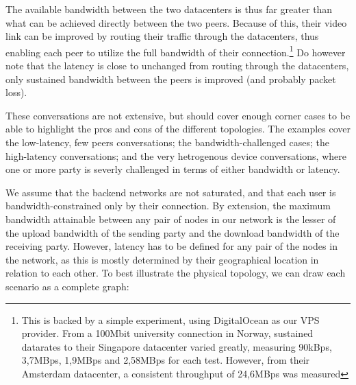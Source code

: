 The available bandwidth between the two datacenters is thus far greater than what can be achieved directly between the two peers. Because of this, their video link can be improved by routing their traffic through the datacenters, thus enabling each peer to utilize the full bandwidth of their connection.\footnote{This is backed by a simple experiment, using DigitalOcean as our VPS provider. From a 100Mbit university connection in Norway, sustained datarates to their Singapore datacenter varied greatly, measuring 90kBps, 3,7MBps, 1,9MBps and 2,58MBps for each test. However, from their Amsterdam datacenter, a consistent throughput of 24,6MBps was measured} Do however note that the latency is close to unchanged from routing through the datacenters, only sustained bandwidth between the peers is improved (and probably packet loss).

These conversations are not extensive, but should cover enough corner cases to be able to highlight the pros and cons of the different topologies. The examples cover the low-latency, few peers conversations; the bandwidth-challenged cases; the high-latency conversations; and the very hetrogenous device conversations, where one or more party is severly challenged in terms of either bandwidth or latency.

We assume that the backend networks are not saturated, and that each user is bandwidth-constrained only by their connection. By extension, the maximum bandwidth attainable between any pair of nodes in our network is the lesser of the upload bandwidth of the sending party and the download bandwidth of the receiving party. However, latency has to be defined for any pair of the nodes in the network, as this is mostly determined by their geographical location in relation to each other. To best illustrate the physical topology, we can draw each scenario as a complete graph:

